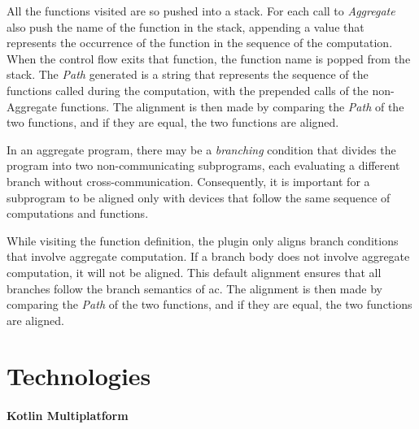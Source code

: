 All the functions visited are so pushed into a stack.
For each call to \emph{Aggregate} also push the name of the function in the stack, appending a value that represents the
occurrence of the function in the sequence of the computation.
When the control flow exits that function, the function name is popped from the stack.
The \emph{Path} generated is a string that represents the sequence of the functions called during the computation,
with the prepended calls of the non-Aggregate functions.
The alignment is then made by comparing the \emph{Path} of the two functions, and if they are equal, the two functions are aligned.

In an aggregate program, there may be a \emph{branching} condition that divides the program into two non-communicating subprograms,
each evaluating a different branch without cross-communication.
Consequently, it is important for a subprogram to be aligned only with devices that follow the same sequence of
computations and functions.

While visiting the function definition, the plugin only aligns branch conditions that involve aggregate computation.
If a branch body does not involve aggregate computation, it will not be aligned.
This default alignment ensures that all branches follow the branch semantics of \ac{ac}.
The alignment is then made by comparing the \emph{Path} of the two functions, and if they are equal, the two functions are aligned.


\section{Technologies}
\label{sec:technologies}

\paragraph{Kotlin Multiplatform}
\label{par:kotlin-multiplatform}

